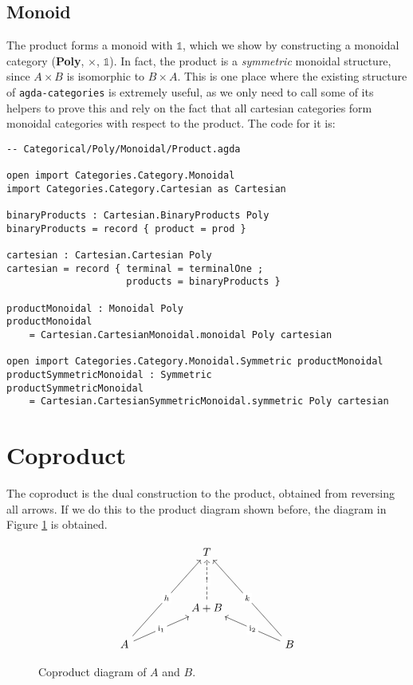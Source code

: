 \subsection{Monoid}

The product forms a monoid with $\mathbb{1}$, which we show by constructing a monoidal category (\textbf{Poly}, $\times$, $\mathbb{1}$). In fact, the product is a \textit{symmetric} monoidal structure, since $A \times B$ is isomorphic to $B \times A$. This is one place where the existing structure of \texttt{agda-categories} is extremely useful, as we only need to call some of its helpers to prove this and rely on the fact that all cartesian categories form monoidal categories with respect to the product. The code for it is:

\begin{verbatim}
-- Categorical/Poly/Monoidal/Product.agda

open import Categories.Category.Monoidal
import Categories.Category.Cartesian as Cartesian

binaryProducts : Cartesian.BinaryProducts Poly
binaryProducts = record { product = prod }

cartesian : Cartesian.Cartesian Poly
cartesian = record { terminal = terminalOne ; 
                     products = binaryProducts }

productMonoidal : Monoidal Poly
productMonoidal 
    = Cartesian.CartesianMonoidal.monoidal Poly cartesian

open import Categories.Category.Monoidal.Symmetric productMonoidal
productSymmetricMonoidal : Symmetric
productSymmetricMonoidal 
    = Cartesian.CartesianSymmetricMonoidal.symmetric Poly cartesian
\end{verbatim}

\newpage

\section{Coproduct}
The coproduct is the dual construction to the product, obtained from reversing all arrows. If we do this to the product diagram shown before, the diagram in Figure \ref{fig:coproductDiagram} is obtained.

\begin{figure}[H]
  \[\begin{tikzcd}
    && T \\
    \\
    && {A + B} \\
    A &&&& B
    \arrow["{\text{i}_1}"{description}, from=4-1, to=3-3]
    \arrow["{\text{i}_2}"{description}, from=4-5, to=3-3]
    \arrow["{!}"{description}, dashed, from=3-3, to=1-3]
    \arrow["h"{description}, from=4-1, to=1-3]
    \arrow["k"{description}, from=4-5, to=1-3]
  \end{tikzcd}\]
  \caption{Coproduct diagram of $A$ and $B$.}
  \label{fig:coproductDiagram}
  \end{figure}

